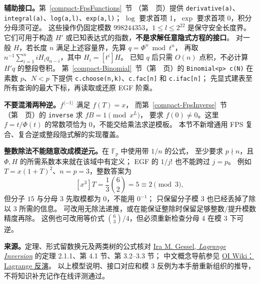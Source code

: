 \textbf{辅助接口。}第~\ref{compact-FpsFunctions}~节
（第~\pageref{compact-FpsFunctions}~页）提供 \texttt{derivative(a)}、
\texttt{integral(a)}、\texttt{log(a,l)}、\texttt{exp(a,l)}；
$\log$ 要求首项 1，$\exp$ 要求首项 0，积分分母须可逆。
这些操作仍固定模数 $998244353$，$1\le l\le2^{22}$ 是保守安全长度界。
它们可用于构造 $H'$ 或已知表达式的指数，\textbf{不是求解任意隐式方程的接口}。
对一般 $H$，若长度 $n$ 满足上述容量界，先算 $q=\Phi^n\bmod t^n$，
再取 $n^{-1}\sum_{i=1}^n iH_iq_{n-i}$，其中 $H_i=[t^i]H$。
已知 $q$ 后只需 $O(n)$ 点积，不必计算 $H'q$ 的整段卷积。
第~\ref{compact-Binomial}~节（第~\pageref{compact-Binomial}~页）的
\texttt{Binomial<p> c(N)} 在素数 $p$、$N<p$ 下提供
\texttt{c.choose(n,k)}、\texttt{c.fac[n]} 和 \texttt{c.ifac[n]}；
先显式建表至所有查询的最大下标，再读取或还原 EGF 阶乘。

\textbf{不要混淆两种逆。}$f^{\langle-1\rangle}$ 满足 $f(T)=x$，
而第~\ref{compact-FpsInverse}~节（第~\pageref{compact-FpsInverse}~页）的
\texttt{inverse} 求 $fB=1\pmod{x^L}$，
要求 $f(0)\ne0$。这里 $f=t/\Phi(t)$ 的常数项恰为 0，不能交给乘法求逆模板。
本节不新增通用 FPS 复合、复合逆或整段隐式解的实现覆盖。

\textbf{整数除法不能随意改成模逆元。}在 $\mathbb F_p$ 中使用带 $1/n$ 的公式，
至少要求 $p\nmid n$，且 $\Phi,H$ 的所需系数本来就在该域中有定义；
EGF 的 $1/j!$ 也不能跨过 $j=p$。
例如 $T=x(1+T)^2$、$n=p=3$，整数答案为
\[
[x^3]T=\frac13\binom62=5\equiv2\pmod3,
\]
但分子 $15$ 与分母 $3$ 先取模都为 0，不能用 $0^{-1}$；
只保留分子模 3 也已经丢掉了除以 3 所需的信息。
可改用无除法递推，或在能保证整除时保留足够整数/提升模数精度再除。
这例也可改用等价式 $\binom63/4$，但必须重新检查分母 4 在模 3 下可逆。

\textbf{来源。}定理、形式留数换元及两类树的公式核对
\href{https://arxiv.org/abs/1609.05988}{Ira M. Gessel, \emph{Lagrange Inversion}}
的定理 2.1.1、第 4.1 节、第 3.2--3.3 节；
中文概念导航参见 \href{https://oi-wiki.org/math/poly/lagrange-inversion/}{OI Wiki：Lagrange 反演}。
以上模型说明、接口对应和模 3 反例为本手册重新组织的推导，不将知识补充记作在线评测通过。
